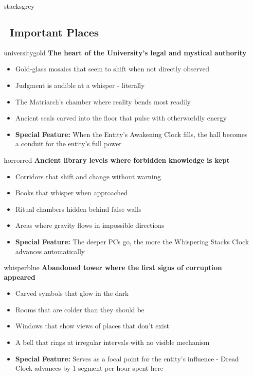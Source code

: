 \documentclass[11pt]{article}
\begin{document}
\begin{campaignsection}{stacksgrey}
\subsection*{\faBuilding\ Important Places}

\begin{mechanicbox}{universitygold}
\textbf{The heart of the University's legal and mystical authority}
\begin{itemize}
    \item Gold-glass mosaics that seem to shift when not directly observed
    \item Judgment is audible at a whisper - literally
    \item The Matriarch's chamber where reality bends most readily
    \item Ancient seals carved into the floor that pulse with otherworldly energy
    \item \textbf{Special Feature:} When the Entity's Awakening Clock fills, the hall becomes a conduit for the entity's full power
\end{itemize}
\end{mechanicbox}

\begin{mechanicbox}{horrorred}
\textbf{Ancient library levels where forbidden knowledge is kept}
\begin{itemize}
    \item Corridors that shift and change without warning
    \item Books that whisper when approached
    \item Ritual chambers hidden behind false walls
    \item Areas where gravity flows in impossible directions
    \item \textbf{Special Feature:} The deeper PCs go, the more the Whispering Stacks Clock advances automatically
\end{itemize}
\end{mechanicbox}

\begin{mechanicbox}{whisperblue}
\textbf{Abandoned tower where the first signs of corruption appeared}
\begin{itemize}
    \item Carved symbols that glow in the dark
    \item Rooms that are colder than they should be
    \item Windows that show views of places that don't exist
    \item A bell that rings at irregular intervals with no visible mechanism
    \item \textbf{Special Feature:} Serves as a focal point for the entity's influence - Dread Clock advances by 1 segment per hour spent here
\end{itemize}
\end{mechanicbox}


\end{campaignsection}
\end{document}
